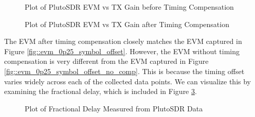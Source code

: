 \documentclass{article}
\begin{document}
\begin{figure}[H]
	\centerline{}
	\caption{Plot of PlutoSDR EVM vs TX Gain before Timing Compensation}
	\label{fig::pluto_evm_no_comp}
\end{figure}

\begin{figure}[H]
	\centerline{}
	\caption{Plot of PlutoSDR EVM vs TX Gain after Timing Compensation}
	\label{fig::pluto_evm}
\end{figure}

\noindent The EVM after timing compensation closely matches the EVM captured in Figure \ref{fig::evm_0p25_symbol_offset}. However, the EVM without timing compensation is very different from the EVM captured in Figure \ref{fig::evm_0p25_symbol_offset_no_comp}. This is because the timing offset varies widely across each of the collected data points. We can visualize this by examining the fractional delay, which is included in Figure \ref{fig::pluto_fractional_delay}.

\begin{figure}[H]
	\centerline{}
	\caption{Plot of Fractional Delay Measured from PlutoSDR Data}
	\label{fig::pluto_fractional_delay}
\end{figure}
\end{document}
